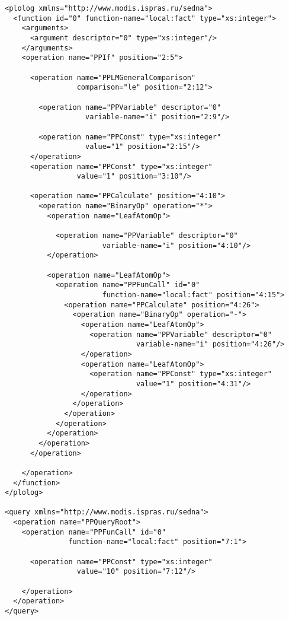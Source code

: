 \documentclass[a4paper,12pt]{article}
\begin{document}
\begin{verbatim}
<plolog xmlns="http://www.modis.ispras.ru/sedna">
  <function id="0" function-name="local:fact" type="xs:integer">
    <arguments>
      <argument descriptor="0" type="xs:integer"/>
    </arguments>
    <operation name="PPIf" position="2:5">

      <operation name="PPLMGeneralComparison" 
                 comparison="le" position="2:12">

        <operation name="PPVariable" descriptor="0" 
                   variable-name="i" position="2:9"/>

        <operation name="PPConst" type="xs:integer" 
                   value="1" position="2:15"/>
      </operation>
      <operation name="PPConst" type="xs:integer" 
                 value="1" position="3:10"/>

      <operation name="PPCalculate" position="4:10">
        <operation name="BinaryOp" operation="*">
          <operation name="LeafAtomOp">

            <operation name="PPVariable" descriptor="0" 
                       variable-name="i" position="4:10"/>
          </operation>

          <operation name="LeafAtomOp">
            <operation name="PPFunCall" id="0" 
                       function-name="local:fact" position="4:15">
              <operation name="PPCalculate" position="4:26">
                <operation name="BinaryOp" operation="-">
                  <operation name="LeafAtomOp">
                    <operation name="PPVariable" descriptor="0" 
                               variable-name="i" position="4:26"/>
                  </operation>
                  <operation name="LeafAtomOp">
                    <operation name="PPConst" type="xs:integer" 
                               value="1" position="4:31"/>
                  </operation>
                </operation>
              </operation>
            </operation>
          </operation>
        </operation>
      </operation>
    
    </operation>
  </function>
</plolog>

<query xmlns="http://www.modis.ispras.ru/sedna">
  <operation name="PPQueryRoot">
    <operation name="PPFunCall" id="0" 
               function-name="local:fact" position="7:1">

      <operation name="PPConst" type="xs:integer" 
                 value="10" position="7:12"/>

    </operation>
  </operation>
</query>
\end{verbatim}
\end{document}

